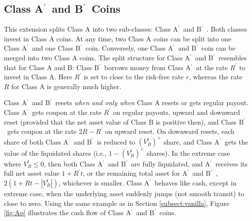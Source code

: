 \documentclass[draft, noinfoline]{ectaart}
\numberwithin{equation}{section}
\theoremstyle{plain}
\newcommand{\Ap}{A\ensuremath{^\prime}~}
\newcommand{\Bp}{B\ensuremath{^\prime}~}
\begin{document}
\subsection{\texorpdfstring{Class \Ap and \Bp Coins}{Lg}}\label{subsect:Ap}
This extension splits Class A into two sub-classes: Class \Ap and \Bp. Both classes invest in Class A coins. At any time, two Class A coins can be split into one Class \Ap and one Class \Bp coin. Conversely, one Class \Ap and \Bp coin can be merged into two Class A coins. The split structure for Class \Ap and \Bp resembles that for Class A and B: Class \Bp borrows money from Class \Ap at the rate $R^\prime$ to invest in Class A. Here $R^\prime$ is set to close to the risk-free rate $r$, whereas the rate $R$ for Class A is generally much higher.

Class \Ap and \Bp resets {\it when and only when} Class A resets or gets regular payout. Class \Ap gets coupon at the rate $R^\prime$ on regular payouts, upward and downward reset (provided that the net asset value of Class B is positive then), and Class \Bp gets coupon at the rate $2R-R^\prime$ on upward reset. On downward resets, each share of both Class \Ap and \Bp is reduced to $(V_B^t)^+$ share, and Class \Ap gets the value of the liquidated shares (i.e., $1-(V_B^t)^+$ shares). In the extreme case where $V_B^t\le 0$, then both Class \Ap and \Bp are fully liquidated, and \Ap receives its full net asset value $1+R^\prime t$, or the remaining total asset for \Ap and \Bp, $2(1+Rt-|V_B^t|)$, whichever is smaller. Class \Ap behaves like cash, except in extreme case, when the underlying asset suddenly jumps (not smooth transit) to close to zero. Using the same example as in Section \ref{subsect:vanilla}, Figure \ref{fig:Ap} illustrates the cash flow of Class \Ap and \Bp coins.






\end{document}
